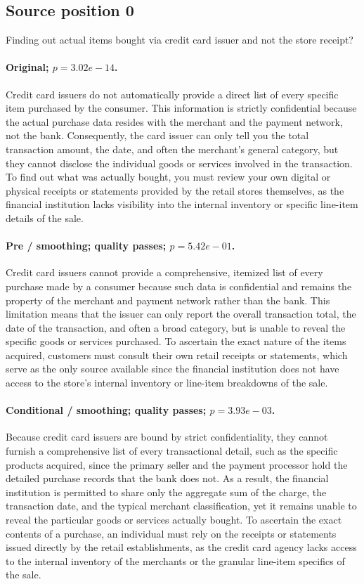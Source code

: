\subsection*{Source position 0}
Finding out actual items bought via credit card issuer and not the store receipt?

\paragraph{Original; $p=3.02e-14$.} Credit card issuers do not automatically provide a direct list of every specific item purchased by the consumer. This information is strictly confidential because the actual purchase data resides with the merchant and the payment network, not the bank. Consequently, the card issuer can only tell you the total transaction amount, the date, and often the merchant's general category, but they cannot disclose the individual goods or services involved in the transaction. To find out what was actually bought, you must review your own digital or physical receipts or statements provided by the retail stores themselves, as the financial institution lacks visibility into the internal inventory or specific line-item details of the sale.


\paragraph{Pre / smoothing; quality passes; $p=5.42e-01$.} Credit card issuers cannot provide a comprehensive, itemized list of every purchase made by a consumer because such data is confidential and remains the property of the merchant and payment network rather than the bank. This limitation means that the issuer can only report the overall transaction total, the date of the transaction, and often a broad category, but is unable to reveal the specific goods or services purchased. To ascertain the exact nature of the items acquired, customers must consult their own retail receipts or statements, which serve as the only source available since the financial institution does not have access to the store's internal inventory or line-item breakdowns of the sale.

\paragraph{Conditional / smoothing; quality passes; $p=3.93e-03$.} Because credit card issuers are bound by strict confidentiality, they cannot furnish a comprehensive list of every transactional detail, such as the specific products acquired, since the primary seller and the payment processor hold the detailed purchase records that the bank does not. As a result, the financial institution is permitted to share only the aggregate sum of the charge, the transaction date, and the typical merchant classification, yet it remains unable to reveal the particular goods or services actually bought. To ascertain the exact contents of a purchase, an individual must rely on the receipts or statements issued directly by the retail establishments, as the credit card agency lacks access to the internal inventory of the merchants or the granular line-item specifics of the sale.

